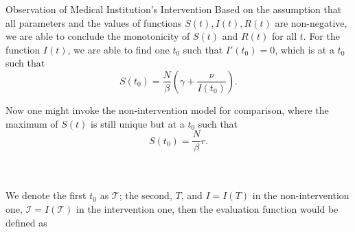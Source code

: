 \documentclass[8pt, hyperref={colorlinks=true}]{beamer}
\begin{document}
\begin{frame}{Observation of Medical Institution's Intervention}
Based on the assumption that all parameters and the values of functions $S(t),I(t),R(t)$ are non-negative, we are able to conclude the monotonicity of $S(t)$ and $R(t)$ for all $t$. For the function $I(t)$, we are able to find one $t_0$ such that $I'(t_0)=0$, which is at a $t_0$ such that \[S(t_0)=\frac{N}{\beta}\left(\gamma+\frac{\nu}{I(t_0)}\right).\]

Now one might invoke the non-intervention model for comparison, where the maximum of $S(t)$ is still unique but at a $t_0$ such that \[S(t_0)=\frac{N}{\beta}r.\]\\~\

We denote the first $t_0$ as $\mathcal{T}$; the second, $T$, and $I=I(T)$ in the non-intervention one, $\mathcal{I}=I(\mathcal{T})$ in the intervention one, then the evaluation function would be defined as
\begin{definition}
\end{definition}
\end{frame}
\end{document}
